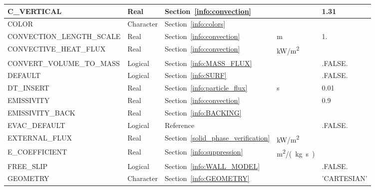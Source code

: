 \documentclass[11pt]{book}
\begin{document}
\begin{longtable}{@{\extracolsep{\fill}}|l|l|l|l|l|}
{\ct C\_VERTICAL}                     & Real            & Section~\ref{info:convection}             &                     & 1.31                    \\ \hline
{\ct COLOR    }                       & Character       & Section~\ref{info:colors}                 &                     &                         \\ \hline
{\ct CONVECTION\_LENGTH\_SCALE}       & Real            & Section~\ref{info:convection}             & m                   & 1.                      \\ \hline
{\ct CONVECTIVE\_HEAT\_FLUX}          & Real            & Section~\ref{info:convection}             & \si{kW/m^2}         &                         \\ \hline
{\ct CONVERT\_VOLUME\_TO\_MASS}       & Logical         & Section~\ref{info:MASS_FLUX}              &                     & {\ct .FALSE.}           \\ \hline
{\ct DEFAULT}                         & Logical         & Section~\ref{info:SURF}                   &                     & {\ct .FALSE.}           \\ \hline
{\ct DT\_INSERT}                      & Real            & Section~\ref{info:particle_flux}          & s                   & 0.01                    \\ \hline
{\ct EMISSIVITY}                      & Real            & Section~\ref{info:convection}             &                     & 0.9                     \\ \hline
{\ct EMISSIVITY\_BACK}                & Real            & Section~\ref{info:BACKING}                &                     &                         \\ \hline
{\ct EVAC\_DEFAULT}                   & Logical         & Reference~\cite{FDS_Evac_Users_Guide}     &                     & {\ct .FALSE.}           \\ \hline
{\ct EXTERNAL\_FLUX}                  & Real            & Section~\ref{solid_phase_verification}    & \si{kW/m^2}         &                         \\ \hline
{\ct E\_COEFFICIENT}                  & Real            & Section~\ref{info:suppression}            & \si{m^2/(kg.s)}     &                         \\ \hline
{\ct FREE\_SLIP}                      & Logical         & Section~\ref{info:WALL_MODEL}             &                     & {\ct .FALSE.}           \\ \hline
{\ct GEOMETRY}                        & Character       & Section~\ref{info:GEOMETRY}               &                     & {\ct 'CARTESIAN'}       \\ \hline

\end{longtable}
\end{document}
